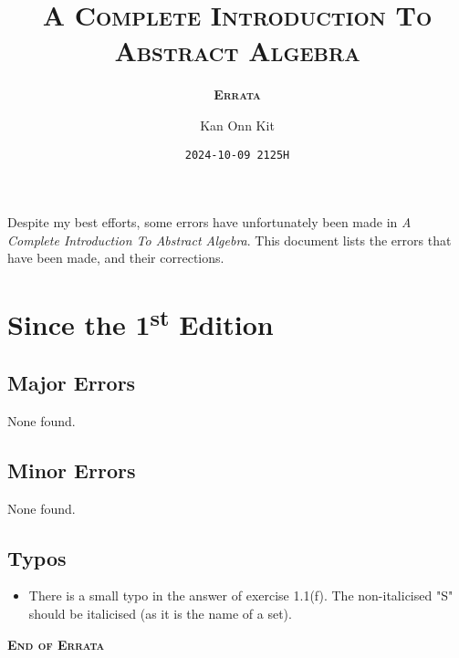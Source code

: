 \documentclass[
    a4paper,
    chapterprefix,
    DIV=9
]{scrartcl}
\title{\bfseries\scshape A Complete Introduction To\\Abstract Algebra}
\subtitle{\bfseries\scshape Errata}
\date{\texttt{2024-10-09 2125H}}
\author{Kan Onn Kit}
\begin{document}
\maketitle

Despite my best efforts, some errors have unfortunately been made in \textit{A Complete Introduction To Abstract Algebra}. This document lists the errors that have been made, and their corrections.

\section*{Since the 1\textsuperscript{st} Edition}
\subsection*{Major Errors}
None found.

\subsection*{Minor Errors}
None found.

\subsection*{Typos}
\begin{itemize}
    \item There is a small typo in the answer of exercise 1.1(f). The non-italicised "S" should be italicised (as it is the name of a set).
\end{itemize}

\begin{center}
    \vfill
    {\Large\bfseries\scshape End of Errata}
\end{center}
\end{document}

